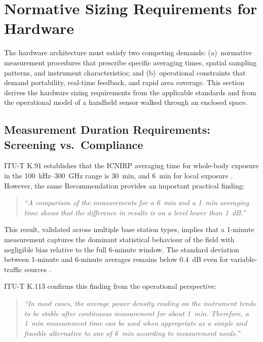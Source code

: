 \documentclass[11pt,a4paper]{article}
\begin{document}
\section{Normative Sizing Requirements for Hardware}
\label{sec:normative_requirements}

The hardware architecture must satisfy two competing demands: (a)~normative measurement procedures that prescribe specific averaging times, spatial sampling patterns, and instrument characteristics; and (b)~operational constraints that demand portability, real-time feedback, and rapid area coverage. This section derives the hardware sizing requirements from the applicable standards and from the operational model of a handheld sensor walked through an enclosed space.

\subsection{Measurement Duration Requirements: Screening vs.~Compliance}

ITU-T K.91 \cite{itut_k91} establishes that the ICNIRP averaging time for whole-body exposure in the 100~kHz--300~GHz range is 30~min, and 6~min for local exposure \cite{icnirp2020}. However, the same Recommendation provides an important practical finding:

\begin{quote}
\textit{``A comparison of the measurements for a 6~min and a 1~min averaging time shows that the difference in results is on a level lower than 1~dB.''}
\end{quote}

\noindent This result, validated across multiple base station types, implies that a 1-minute measurement captures the dominant statistical behaviour of the field with negligible bias relative to the full 6-minute window. The standard deviation between 1-minute and 6-minute averages remains below 0.4~dB even for variable-traffic sources \cite{itut_k91}.

ITU-T K.113 \cite{itut_k113} confirms this finding from the operational perspective:

\begin{quote}
\textit{``In most cases, the average power density reading on the instrument tends to be stable after continuous measurement for about 1~min. Therefore, a 1~min measurement time can be used when appropriate as a simple and feasible alternative to one of 6~min according to measurement needs.''}
\end{quote}
\end{document}
